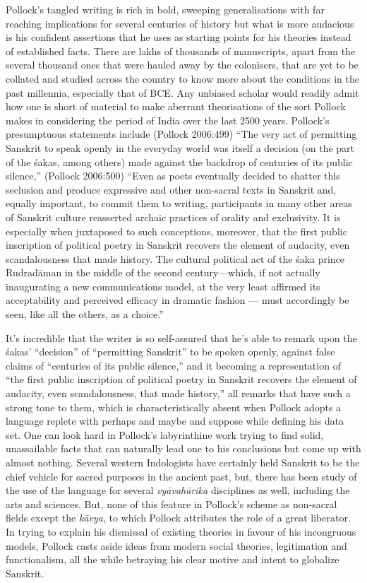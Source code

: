 Pollock’s tangled writing is rich in bold, sweeping generalisations with far reaching implications for several centuries of history but what is more audacious is his confident assertions that he uses as starting points for his theories instead of established facts. There are lakhs of thousands of manuscripts, apart from the several thousand ones that were hauled away by the colonisers, that are yet to be collated and studied across the country to know more about the conditions in the past millennia, especially that of BCE. Any unbiased scholar would readily admit how one is short of material to make aberrant theorisations of the sort Pollock makes in considering the period of India over the last 2500 years. Pollock’s presumptuous statements include (Pollock 2006:499) “The very act of permitting Sanskrit to speak openly in the everyday world was itself a decision (on the part of the śakas, among others) made against the backdrop of centuries of its public silence,” (Pollock 2006:500) “Even as poets eventually decided to shatter this seclusion and produce expressive and other non-sacral texts in Sanskrit and, equally important, to commit them to writing, participants in many other areas of Sanskrit culture reasserted archaic practices of orality and exclusivity. It is especially when juxtaposed to such conceptions, moreover, that the first public inscription of political poetry in Sanskrit recovers the element of audacity, even scandalousness that made history. The cultural political act of the śaka prince Rudradāman in the middle of the second century—which, if not actually inaugurating a new communications model, at the very least affirmed its acceptability and perceived efficacy in dramatic fashion — must accordingly be seen, like all the others, as a choice.”

It’s incredible that the writer is so self-assured that he’s able to remark upon the śakas’ “decision” of “permitting Sanskrit” to be spoken openly, against false claims of “centuries of its public silence,” and it becoming a representation of “the first public inscription of political poetry in Sanskrit recovers the element of audacity, even scandalousness, that made history,” all remarks that have such a strong tone to them, which is characteristically absent when Pollock adopts a language replete with perhaps and maybe and suppose while defining his data set. One can look hard in Pollock’s labyrinthine work trying to find solid, unassailable facts that can naturally lead one to his conclusions but come up with almost nothing. Several western Indologists have certainly held Sanskrit to be the chief vehicle for sacred purposes in the ancient past, but, there has been study of the use of the language for several \textit{vyāvahārika} disciplines as well, including the arts and sciences. But, none of this feature in Pollock’s scheme as non-sacral fields except the \textit{kāvya}, to which Pollock attributes the role of a great liberator. In trying to explain his dismissal of existing theories in favour of his incongruous models, Pollock casts aside ideas from modern social theories, legitimation and functionalism, all the while betraying his clear motive and intent to globalize Sanskrit.

